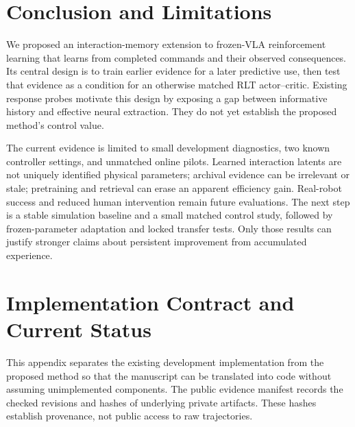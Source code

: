 \documentclass[10pt,letterpaper]{article}
\begin{document}
\section{Conclusion and Limitations}
We proposed an interaction-memory extension to frozen-VLA reinforcement learning that learns from completed commands and their observed consequences. Its central design is to train earlier evidence for a later predictive use, then test that evidence as a condition for an otherwise matched RLT actor--critic. Existing response probes motivate this design by exposing a gap between informative history and effective neural extraction. They do not yet establish the proposed method's control value.

The current evidence is limited to small development diagnostics, two known controller settings, and unmatched online pilots. Learned interaction latents are not uniquely identified physical parameters; archival evidence can be irrelevant or stale; pretraining and retrieval can erase an apparent efficiency gain. Real-robot success and reduced human intervention remain future evaluations. The next step is a stable simulation baseline and a small matched control study, followed by frozen-parameter adaptation and locked transfer tests. Only those results can justify stronger claims about persistent improvement from accumulated experience.




\clearpage
\appendix
\section{Implementation Contract and Current Status}
\label{app:implementation}
This appendix separates the existing development implementation from the proposed method so that the manuscript can be translated into code without assuming unimplemented components. The public evidence manifest records the checked revisions and hashes of underlying private artifacts. These hashes establish provenance, not public access to raw trajectories.
\end{document}

